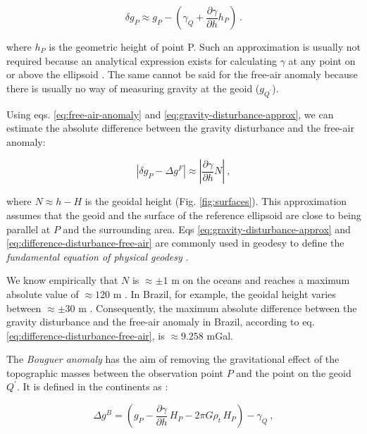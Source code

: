 \documentclass[extra]{gji}
\begin{document}
\begin{equation}
\delta g_{P} \approx g_{P} -
\left( \gamma_{Q} + \frac{\partial \gamma}{\partial h} h_P \right) \: .
\label{eq:gravity-disturbance-approx}
\end{equation}

\noindent
where $h_P$ is the geometric height of point P.
Such an approximation is usually not required because
an analytical expression exists for calculating $\gamma$ at any point
on or above the ellipsoid \citep{li2001}.
The same cannot be said for the free-air anomaly because
there is usually no way of measuring gravity at the geoid ($g_{Q^\prime}$).

Using eqs. \ref{eq:free-air-anomaly} and \ref{eq:gravity-disturbance-approx},
we can estimate the absolute difference between the gravity disturbance and the
free-air anomaly:

\begin{equation}
\left\vert \delta g_{P} - \Delta g^{F} \right\vert \approx
\left\vert \frac{\partial \gamma}{\partial h} N \right\vert \: ,
\label{eq:difference-disturbance-free-air}
\end{equation}

\noindent
where $N \approx h - H$ is the geoidal height (Fig. \ref{fig:surfaces}).
This approximation assumes that the geoid and the surface of
the reference ellipsoid are close to being parallel at $P$
and the surrounding area.
Eqs \ref{eq:gravity-disturbance-approx}
and \ref{eq:difference-disturbance-free-air} are commonly used
in geodesy to define the \textit{fundamental equation of physical
geodesy} \citep{hofmann-wellenhof-moritz2005}.

We know empirically that $N$ is $\approx \pm 1$ m on the oceans
and reaches a maximum absolute value of $\approx 120$ m
\citep[e.g.,][]{torge2012, sanso_sideris2013}.
In Brazil, for example, the geoidal height
varies between $\approx \pm 30$ m \citep{ibge_mapgeo2015}.
Consequently,
the maximum absolute difference between the gravity disturbance and
the free-air anomaly in Brazil,
according to eq. \ref{eq:difference-disturbance-free-air},
is $\approx 9.258$ mGal.

The \textit{Bouguer anomaly}
has the aim of removing the gravitational effect of the topographic masses
between the observation point $P$ and the point on the geoid $Q^\prime$.
It is defined in the continents as
\citep{blakely1996, hofmann-wellenhof-moritz2005}:

\begin{equation}
\Delta g^{B} =
\left(g_{P}
    - \frac{\partial \gamma}{\partial h} \, H_{P}
    - 2 \pi G \rho_{t} \, H_{P} \right)
- \gamma_{Q} \: ,
\label{eq:simple-bouguer-anomaly}
\end{equation}
\end{document}

